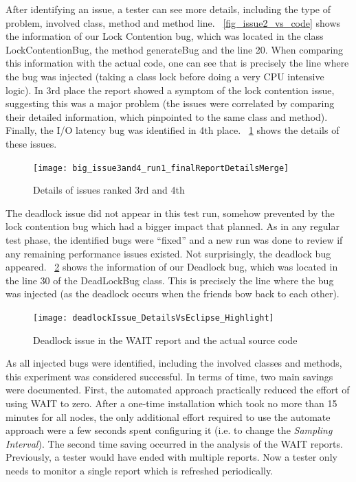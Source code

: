 \documentclass[runningheads,a4paper]{llncs}
\begin{document}
After identifying an issue, a tester can see more details, including the type of
problem, involved class, method and method line. \figurename
~\ref{fig_issue2_vs_code} shows the information of our Lock Contention bug,
which was located in the class LockContentionBug, the method generateBug and the
line 20. When comparing this information with the actual code, one can see that
is precisely the line where the bug was injected (taking a class lock before
doing a very CPU intensive logic). In 3rd place the report showed a symptom of
the lock contention issue, suggesting this was a major problem (the issues were correlated 
by comparing their detailed information, which pinpointed to the same class and
method). Finally, the I/O latency bug was identified in 4th place. \figurename
~\ref{fig_issues34} shows the details of these issues.

\begin{figure}[!h]
\centering
\texttt{[image: big\_issue3and4\_run1\_finalReportDetailsMerge]}
\caption{Details of issues ranked 3rd and 4th}
\label{fig_issues34}
\end{figure}

The deadlock issue did not appear in this test run, somehow prevented by the
lock contention bug which had a bigger impact that planned. As in any regular
test phase, the identified bugs were ``fixed'' and a new run was done to review
if any remaining performance issues existed. Not surprisingly, the deadlock bug
appeared. \figurename ~\ref{fig_dlissue_vs_code} shows the information of our
Deadlock bug, which was located in the line 30 of the DeadLockBug class. This is
precisely the line where the bug was injected (as the deadlock occurs when the
friends bow back to each other).
\begin{figure}[!h]
\centering
\texttt{[image: deadlockIssue\_DetailsVsEclipse\_Highlight]}
\caption{Deadlock issue in the WAIT report and the actual source code}
\label{fig_dlissue_vs_code}
\end{figure}

As all injected bugs were identified, including the involved classes and
methods, this experiment was considered successful. In terms of time, two main
savings were documented. First, the automated approach practically reduced the
effort of using WAIT to zero. After a one-time installation which took no more
than 15 minutes for all nodes, the only additional effort required to use the
automate approach were a few seconds spent configuring it (i.e. to change the
\emph{Sampling Interval}). The second time saving occurred in the analysis of the 
WAIT reports. Previously, a tester would have ended with multiple reports. Now a 
tester only needs to monitor a single report which is refreshed periodically.
\end{document}
